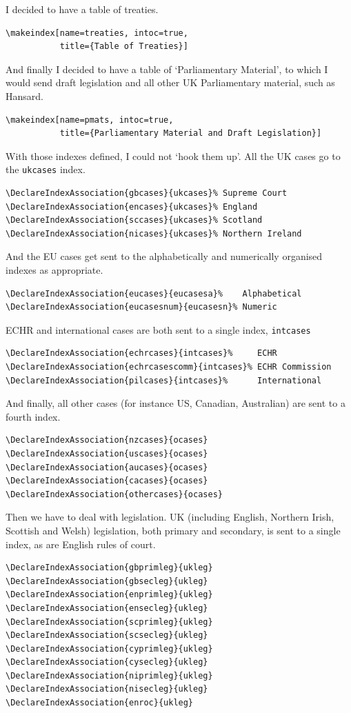 \documentclass[a4paper,
               11pt,
	       DIV=1,			   
	       footinclude=false]
	      {scrartcl}
\begin{document}
I decided to have a table of treaties.
\begin{verbatim}
\makeindex[name=treaties, intoc=true,
           title={Table of Treaties}]
\end{verbatim}

And finally I decided to have a table of `Parliamentary Material', to which I would send draft legislation and all other UK Parliamentary material, such as Hansard.

\begin{verbatim}
\makeindex[name=pmats, intoc=true,
           title={Parliamentary Material and Draft Legislation}]
\end{verbatim}

With those indexes defined, I could not `hook them up'. All the UK cases go to the \texttt{ukcases} index.
\begin{verbatim}
\DeclareIndexAssociation{gbcases}{ukcases}% Supreme Court
\DeclareIndexAssociation{encases}{ukcases}% England
\DeclareIndexAssociation{sccases}{ukcases}% Scotland
\DeclareIndexAssociation{nicases}{ukcases}% Northern Ireland
\end{verbatim}

And the EU cases get sent to the alphabetically and numerically organised indexes as appropriate.
\begin{verbatim}
\DeclareIndexAssociation{eucases}{eucasesa}%    Alphabetical
\DeclareIndexAssociation{eucasesnum}{eucasesn}% Numeric
\end{verbatim}

ECHR and international cases are both sent to a single index, \texttt{intcases}
\begin{verbatim}
\DeclareIndexAssociation{echrcases}{intcases}%     ECHR
\DeclareIndexAssociation{echrcasescomm}{intcases}% ECHR Commission
\DeclareIndexAssociation{pilcases}{intcases}%      International
\end{verbatim}

And finally, all other cases (for instance US, Canadian, Australian) are sent to a fourth index.

\begin{verbatim}
\DeclareIndexAssociation{nzcases}{ocases}
\DeclareIndexAssociation{uscases}{ocases}
\DeclareIndexAssociation{aucases}{ocases}
\DeclareIndexAssociation{cacases}{ocases}
\DeclareIndexAssociation{othercases}{ocases}
\end{verbatim}

Then we have to deal with legislation. UK (including English, Northern Irish, Scottish and Welsh) legislation, both primary and secondary, is sent to a single index, as are English rules of court.
\begin{verbatim}
\DeclareIndexAssociation{gbprimleg}{ukleg}
\DeclareIndexAssociation{gbsecleg}{ukleg}
\DeclareIndexAssociation{enprimleg}{ukleg}
\DeclareIndexAssociation{ensecleg}{ukleg}
\DeclareIndexAssociation{scprimleg}{ukleg}
\DeclareIndexAssociation{scsecleg}{ukleg}
\DeclareIndexAssociation{cyprimleg}{ukleg}
\DeclareIndexAssociation{cysecleg}{ukleg}
\DeclareIndexAssociation{niprimleg}{ukleg}
\DeclareIndexAssociation{nisecleg}{ukleg}
\DeclareIndexAssociation{enroc}{ukleg}
\end{verbatim}
\end{document}
